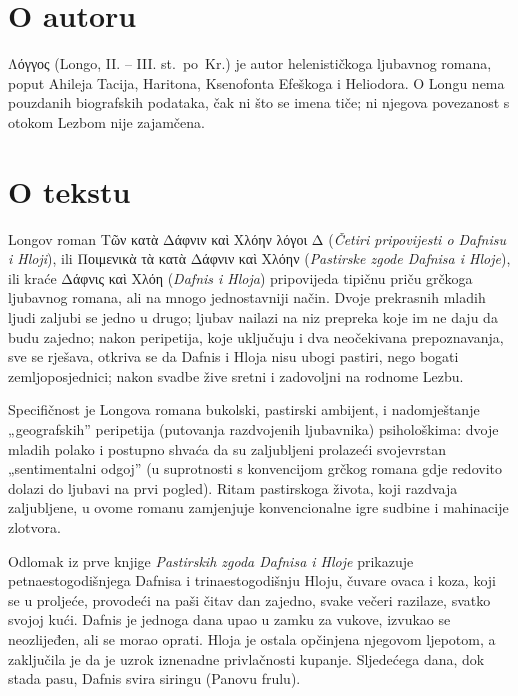 \section*{O autoru}

Λόγγος (Longo, II. – III. st.\ po~Kr.) je autor helenističkoga ljubavnog romana, poput Ahileja Tacija, Haritona, Ksenofonta Efeškoga i Heliodora. O Longu nema pouzdanih biografskih podataka, čak ni što se imena tiče; ni njegova povezanost s otokom Lezbom nije zajamčena.

\section*{O tekstu}

Longov roman \textgreek{Τῶν κατὰ Δάφνιν καὶ Χλόην λόγοι Δ} (\textit{Četiri pripovijesti o Dafnisu i Hloji}), ili \textgreek{Ποιμενικὰ τὰ κατὰ Δάφνιν καὶ Χλόην} (\textit{Pastirske zgode Dafnisa i Hloje}), ili kraće \textgreek{Δάφνις καὶ Χλόη} (\textit{Dafnis i Hloja}) pripovijeda tipičnu priču grčkoga ljubavnog romana, ali na mnogo jednostavniji način. Dvoje prekrasnih mladih ljudi zaljubi se jedno u drugo; ljubav nailazi na niz prepreka koje im ne daju da budu zajedno; nakon peripetija, koje uključuju i dva neočekivana prepoznavanja, sve se rješava, otkriva se da Dafnis i Hloja nisu ubogi pastiri, nego bogati zemljoposjednici; nakon svadbe žive sretni i zadovoljni na rodnome Lezbu.

Specifičnost je Longova romana bukolski, pastirski ambijent, i nadomještanje „geografskih'' peripetija (putovanja razdvojenih ljubavnika) psihološkima: dvoje mladih polako i postupno shvaća da su zaljubljeni prolazeći svojevrstan „sentimentalni odgoj'' (u suprotnosti s konvencijom grčkog romana gdje redovito dolazi do ljubavi na prvi pogled). Ritam pastirskoga života, koji razdvaja zaljubljene, u ovome romanu zamjenjuje konvencionalne igre sudbine i mahinacije zlotvora.

Odlomak iz prve knjige \textit{Pastirskih zgoda Dafnisa i Hloje} prikazuje petnaestogodišnjega Dafnisa i trinaestogodišnju Hloju, čuvare ovaca i koza, koji se u proljeće, provodeći na paši čitav dan zajedno, svake večeri razilaze, svatko svojoj kući. Dafnis je jednoga dana upao u zamku za vukove, izvukao se neozlijeđen, ali se morao oprati. Hloja je ostala opčinjena njegovom ljepotom, a zaključila je da je uzrok iznenadne privlačnosti kupanje. Sljedećega dana, dok stada pasu, Dafnis svira siringu (Panovu frulu).

